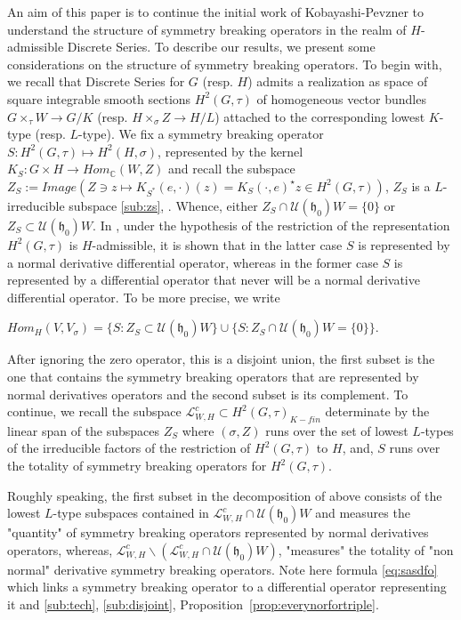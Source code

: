 \documentclass[12pt]{amsart}
\theoremstyle{definition}
\theoremstyle{remark}
\newcommand{\h}{\mathfrak{h}}
\newcommand{\C}{{\mathbb C}}
\numberwithin{equation}{section}
\begin{document}
An aim of this paper   is to continue the initial work of Kobayashi-Pevzner \cite{KP1}\cite{KP2}\cite{KP3}  to understand the
structure of symmetry breaking operators in the realm of
      $H$-admissible Discrete Series. To describe our results, we present some considerations on the structure of symmetry breaking operators. To begin with, we recall that Discrete Series for $G$ (resp. $H$) admits a realization as space of  square integrable smooth sections $H^2(G,\tau)$ of homogeneous vector bundles   $G\times_\tau W \rightarrow G/K$ (resp. $ H\times_\sigma Z \rightarrow H/L$) attached to the corresponding lowest $K$-type  (resp. $L$-type). We fix   a symmetry breaking operator $S:H^2(G,\tau)\mapsto H^2(H,\sigma)$, represented by the kernel $K_S :G\times H \rightarrow Hom_\C( W, Z)$ and recall  the subspace $Z_S:=Image(Z\ni z \mapsto K_{S^*}(e, \cdot) (z)=K_S(\cdot, e)^\star z \in H^2(G,\tau))$, $Z_S$ is a $L$-irreducible subspace \ref{sub:zs}, \cite{OV3}. Whence, either $Z_S \cap \mathcal U(\h_0)W=\{0\}$ or $Z_S \subset \mathcal U(\h_0)W$. In \cite{OV3}, under the hypothesis of the restriction of the representation $H^2(G,\tau)$ is $H$-admissible, it is shown that in the latter case $S$ is represented by a normal derivative differential operator, whereas in the former case $S$ is represented by a differential operator that never will be a normal derivative differential operator. To be more precise, we write

    $Hom_H(V,V_\sigma) =\{ S: Z_S \subset \mathcal U(\h_0)W\}\cup \{ S: Z_S \cap \mathcal U(\h_0)W=\{0\}\}$.

  After ignoring the zero operator,  this is a disjoint union,  the first subset is the one that contains the symmetry breaking operators that are represented by normal derivatives operators and the second subset is its complement. To continue, we recall the subspace   $\mathcal L_{W,H}^c \subset H^2(G,\tau)_{K-fin}$ determinate by the linear span of the subspaces $Z_S$ where $(\sigma, Z)$ runs over the set of lowest $L$-types of the irreducible factors of the restriction of $H^2(G,\tau)$ to $H$, and, $S$ runs over the totality of symmetry breaking operators for $H^2(G,\tau)$.



   Roughly speaking,  the first subset in the decomposition of above consists of the lowest $L$-type subspaces contained in     $ \mathcal L_{W,H}^c\cap \mathcal U(\h_0)W  $ and measures the "quantity" of symmetry breaking operators   represented by normal derivatives operators, whereas, $ \mathcal L_{W,H}^c \backslash (\mathcal L_{W,H}^c\cap \mathcal U(\h_0)W)$,  "measures"  the totality  of "non normal" derivative symmetry breaking operators. Note here formula \ref{eq:sasdfo} which links a symmetry breaking operator to a differential operator representing it and  \ref{sub:tech}, \ref{sub:disjoint}, Proposition~\ref{prop:everynorfortriple}.
\end{document}
